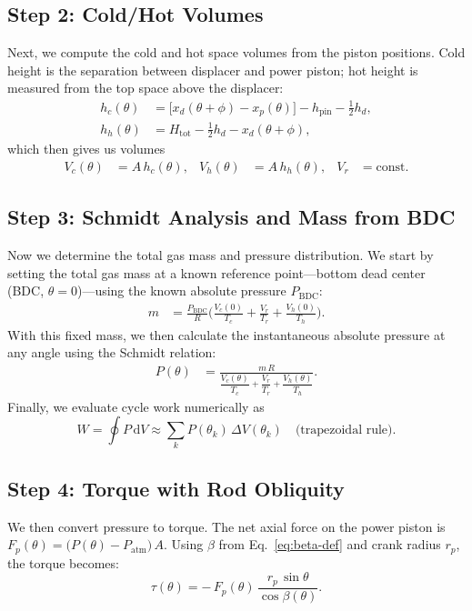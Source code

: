 \documentclass[12pt]{article}
\begin{document}
\subsection{Step 2: Cold/Hot Volumes}
Next, we compute the cold and hot space volumes from the piston positions. Cold height is the separation between displacer and power piston; hot height is measured from the top space above the displacer:
\begin{align}
  h_{c}(\theta) &= \bigl[x_{d}(\theta+\phi) - x_{p}(\theta)\bigr] - h_{\mathrm{pin}} - \tfrac{1}{2}h_{d},\\
  h_{h}(\theta) &= H_{\mathrm{tot}} - \tfrac{1}{2}h_{d} - x_{d}(\theta+\phi),
\end{align}
which then gives us volumes
\begin{align}
  V_{c}(\theta) &= A\,h_{c}(\theta), & V_{h}(\theta) &= A\,h_{h}(\theta), & V_{r} &= \text{const}.
\end{align}

\subsection{Step 3: Schmidt Analysis and Mass from BDC}
Now we determine the total gas mass and pressure distribution. We start by setting the total gas mass at a known reference point—bottom dead center (BDC, \(\theta=0\))—using the known absolute pressure \(P_{\mathrm{BDC}}\):
\begin{align}
  m &= \frac{P_{\mathrm{BDC}}}{R}\biggl( \frac{V_{c}(0)}{T_{c}} + \frac{V_{r}}{T_{r}} + \frac{V_{h}(0)}{T_{h}} \biggr).
\end{align}
With this fixed mass, we then calculate the instantaneous absolute pressure at any angle using the Schmidt relation:
\begin{align}
  P(\theta) &= \frac{m\,R}{\dfrac{V_{c}(\theta)}{T_{c}} + \dfrac{V_{r}}{T_{r}} + \dfrac{V_{h}(\theta)}{T_{h}} }.
\end{align}
Finally, we evaluate cycle work numerically as
\begin{equation}
  W = \oint P\,\mathrm{d}V \approx \sum_{k} P(\theta_{k})\,\Delta V(\theta_{k}) \quad \text{(trapezoidal rule)}.
\end{equation}

\subsection{Step 4: Torque with Rod Obliquity}
We then convert pressure to torque. The net axial force on the power piston is \(F_{p}(\theta) = \bigl(P(\theta)-P_{\mathrm{atm}}\bigr)\,A\). Using \(\beta\) from Eq.~\eqref{eq:beta-def} and crank radius \(r_{p}\), the torque becomes:
\begin{equation}
  \tau(\theta) = -\,F_{p}(\theta)\,\frac{r_{p}\,\sin\theta}{\cos\beta(\theta)}.
\end{equation}
\end{document}
